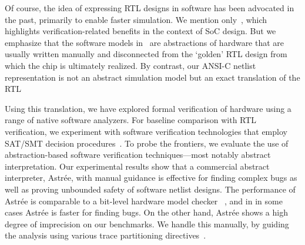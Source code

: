 Of course, the idea of expressing RTL designs in software has been  advocated in the past, primarily to enable faster simulation. We mention only~\cite{soc-keating}, which highlights verification-related benefits in the context of SoC design.  But we emphasize that the software models in~\cite{soc-keating} are abstractions of hardware that are usually written manually and disconnected from the `golden' RTL design  from which the chip is ultimately realized.  By contrast, our ANSI-C netlist representation is not an abstract simulation model but an exact translation of the RTL

Using this translation, we have explored formal verification of hardware using a range of 
native software analyzers.  For baseline comparison with RTL verification, we experiment with software verification technologies that employ SAT/SMT decision procedures~\cite{DBLP:conf/cav/BeyerK11,2ls,cbmc.tacas:2004,DBLP:conf/tacas/HeizmannDGLMSP16}. To 
probe the frontiers, we evaluate the use of abstraction-based software verification 
techniques---most notably abstract interpretation. Our experimental results show that a commercial abstract interpreter,  Astr{\'e}e, with manual guidance is effective for finding complex bugs 
as well as proving unbounded safety of software netlist designs. The performance of Astr{\'e}e is 
comparable to a bit-level hardware model checker \ABC~\cite{abc}, and in 
in some cases Astr{\'e}e is faster for finding bugs.  On the other hand, 
Astr{\'e}e shows a high degree of imprecision on our benchmarks. We handle this 
manually, by guiding the analysis using various trace 
partitioning directives~\cite{DBLP:journals/toplas/RivalM07}.  
%


